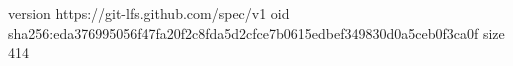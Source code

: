 version https://git-lfs.github.com/spec/v1
oid sha256:eda376995056f47fa20f2c8fda5d2cfce7b0615edbef349830d0a5ceb0f3ca0f
size 414
